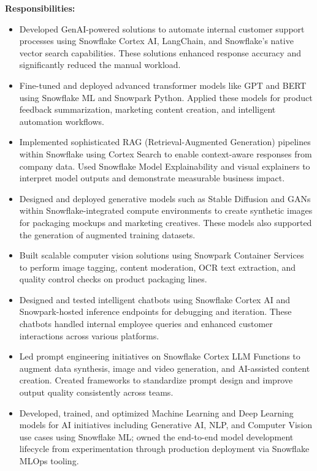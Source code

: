 \documentclass[11pt,letterpaper]{article}
\begin{document}
\textbf{Responsibilities:}
\begin{itemize}
  \item Developed GenAI-powered solutions to automate internal customer support processes using
        Snowflake Cortex AI, LangChain, and Snowflake's native vector search capabilities. These
        solutions enhanced response accuracy and significantly reduced the manual workload.

  \item Fine-tuned and deployed advanced transformer models like GPT and BERT using Snowflake ML
        and Snowpark Python. Applied these models for product feedback summarization, marketing
        content creation, and intelligent automation workflows.

  \item Implemented sophisticated RAG (Retrieval-Augmented Generation) pipelines within Snowflake
        using Cortex Search to enable context-aware responses from company data. Used Snowflake
        Model Explainability and visual explainers to interpret model outputs and demonstrate
        measurable business impact.

  \item Designed and deployed generative models such as Stable Diffusion and GANs within
        Snowflake-integrated compute environments to create synthetic images for packaging mockups
        and marketing creatives. These models also supported the generation of augmented training
        datasets.

  \item Built scalable computer vision solutions using Snowpark Container Services to perform image
        tagging, content moderation, OCR text extraction, and quality control checks on product
        packaging lines.

  \item Designed and tested intelligent chatbots using Snowflake Cortex AI and Snowpark-hosted
        inference endpoints for debugging and iteration. These chatbots handled internal employee
        queries and enhanced customer interactions across various platforms.

  \item Led prompt engineering initiatives on Snowflake Cortex LLM Functions to augment data
        synthesis, image and video generation, and AI-assisted content creation. Created frameworks
        to standardize prompt design and improve output quality consistently across teams.

  \item Developed, trained, and optimized Machine Learning and Deep Learning models for AI
        initiatives including Generative AI, NLP, and Computer Vision use cases using Snowflake ML;
        owned the end-to-end model development lifecycle from experimentation through production
        deployment via Snowflake MLOps tooling.


\end{itemize}
\end{document}
